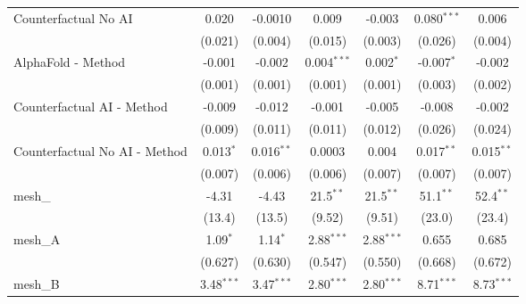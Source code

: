 \begin{tabular}{lcccccc}
   Counterfactual No AI                                        & 0.020          & -0.0010        & 0.009         & -0.003        & 0.080$^{***}$  & 0.006\\   
                                                               & (0.021)        & (0.004)        & (0.015)       & (0.003)       & (0.026)        & (0.004)\\   
   AlphaFold - Method                                          & -0.001         & -0.002         & 0.004$^{***}$ & 0.002$^{*}$   & -0.007$^{*}$   & -0.002\\   
                                                               & (0.001)        & (0.001)        & (0.001)       & (0.001)       & (0.003)        & (0.002)\\   
   Counterfactual AI - Method                                  & -0.009         & -0.012         & -0.001        & -0.005        & -0.008         & -0.002\\   
                                                               & (0.009)        & (0.011)        & (0.011)       & (0.012)       & (0.026)        & (0.024)\\   
   Counterfactual No AI - Method                               & 0.013$^{*}$    & 0.016$^{**}$   & 0.0003        & 0.004         & 0.017$^{**}$   & 0.015$^{**}$\\   
                                                               & (0.007)        & (0.006)        & (0.006)       & (0.007)       & (0.007)        & (0.007)\\   
   mesh\_                                                      & -4.31          & -4.43          & 21.5$^{**}$   & 21.5$^{**}$   & 51.1$^{**}$    & 52.4$^{**}$\\   
                                                               & (13.4)         & (13.5)         & (9.52)        & (9.51)        & (23.0)         & (23.4)\\   
   mesh\_A                                                     & 1.09$^{*}$     & 1.14$^{*}$     & 2.88$^{***}$  & 2.88$^{***}$  & 0.655          & 0.685\\   
                                                               & (0.627)        & (0.630)        & (0.547)       & (0.550)       & (0.668)        & (0.672)\\   
   mesh\_B                                                     & 3.48$^{***}$   & 3.47$^{***}$   & 2.80$^{***}$  & 2.80$^{***}$  & 8.71$^{***}$   & 8.73$^{***}$\\   

\end{tabular}

